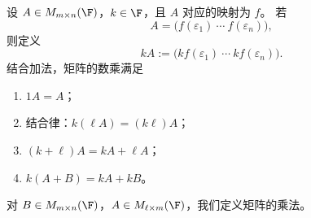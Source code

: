 \begin{definition}[矩阵的数乘]\label{p1:concept:c3-l483}
	设 $A\in M_{m\times n}(\F)$，$k\in\F$，且 $A$ 对应的映射为 $f$。
	若
	\[
	A=\bigl(f(\varepsilon_1)\ \cdots\ f(\varepsilon_n)\bigr),
	\]
	则定义
	\[
	kA:=\bigl(kf(\varepsilon_1)\ \cdots\ kf(\varepsilon_n)\bigr).
	\]
	结合加法，矩阵的数乘满足
	\begin{enumerate}
		\item $1A=A$；
		\item 结合律：$k(\ell A)=(k\ell)A$；
		\item $(k+\ell)A=kA+\ell A$；
		\item $k(A+B)=kA+kB$。
	\end{enumerate}
\end{definition}

对 $B\in M_{m\times n}(\F)$，$A\in M_{\ell\times m}(\F)$，我们定义矩阵的乘法。

